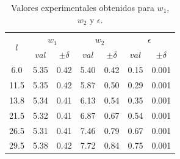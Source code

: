 \documentclass[10pt]{article}
\begin{document}
        \begin{table}[H]
            \centering
            \begin{tabular}{|c|ll|ll|ll|}
            \hline
            \multirow{2}{*}{\textbf{$l$}} & \multicolumn{2}{c|}{\textbf{$w_1$}}                                      & \multicolumn{2}{c|}{\textbf{$w_2$}}                                      & \multicolumn{2}{c|}{\textbf{$ \epsilon $}}                                       \\ \cline{2-7} 
                                                        & \multicolumn{1}{c|}{\textbf{$val$}} & \multicolumn{1}{c|}{\textbf{$\pm\delta$}} & \multicolumn{1}{c|}{\textbf{$val$}} & \multicolumn{1}{c|}{\textbf{$\pm\delta$}} & \multicolumn{1}{c|}{\textbf{$val$}} & \multicolumn{1}{c|}{\textbf{$\pm\delta$}} \\ \hline
            6.0                                         & \multicolumn{1}{l|}{5.35}         & 0.42                              & \multicolumn{1}{l|}{5.40}         & 0.42                              & \multicolumn{1}{l|}{0.15}         & 0.001                             \\ \hline
            11.5                                        & \multicolumn{1}{l|}{5.35}         & 0.42                              & \multicolumn{1}{l|}{5.87}         & 0.50                              & \multicolumn{1}{l|}{0.29}         & 0.001                             \\ \hline
            13.8                                        & \multicolumn{1}{l|}{5.34}         & 0.41                              & \multicolumn{1}{l|}{6.13}         & 0.54                              & \multicolumn{1}{l|}{0.35}         & 0.001                             \\ \hline
            21.5                                        & \multicolumn{1}{l|}{5.32}         & 0.41                              & \multicolumn{1}{l|}{6.87}         & 0.67                              & \multicolumn{1}{l|}{0.54}         & 0.001                             \\ \hline
            26.5                                        & \multicolumn{1}{l|}{5.31}         & 0.41                              & \multicolumn{1}{l|}{7.46}         & 0.79                              & \multicolumn{1}{l|}{0.67}         & 0.001                             \\ \hline
            29.5                                        & \multicolumn{1}{l|}{5.38}         & 0.42                              & \multicolumn{1}{l|}{7.72}         & 0.84                              & \multicolumn{1}{l|}{0.75}         & 0.001                             \\ \hline
            \end{tabular}
            \caption{Valores experimentales obtenidos para $w_1$, $w_2$ y $\epsilon$.}
        \end{table}
\end{document}
